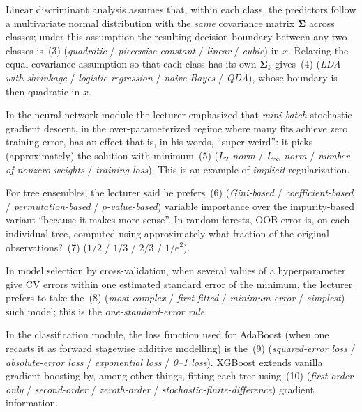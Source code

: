 \documentclass[11pt,a4paper]{article}
\begin{document}
Linear discriminant analysis assumes that, within each class, the predictors follow a multivariate normal distribution with the \emph{same} covariance matrix $\bm\Sigma$ across classes; under this assumption the resulting decision boundary between any two classes is \underline{\hspace{2.5cm}}\,(3) (\emph{quadratic} / \emph{piecewise constant} / \emph{linear} / \emph{cubic}) in $x$. Relaxing the equal-covariance assumption so that each class has its own $\bm\Sigma_k$ gives \underline{\hspace{2.5cm}}\,(4) (\emph{LDA with shrinkage} / \emph{logistic regression} / \emph{naive Bayes} / \emph{QDA}), whose boundary is then quadratic in $x$.

In the neural-network module the lecturer emphasized that \emph{mini-batch} stochastic gradient descent, in the over-parameterized regime where many fits achieve zero training error, has an effect that is, in his words, ``super weird'': it picks (approximately) the solution with minimum \underline{\hspace{2.5cm}}\,(5) (\emph{$L_2$ norm} / \emph{$L_\infty$ norm} / \emph{number of nonzero weights} / \emph{training loss}). This is an example of \emph{implicit} regularization.

For tree ensembles, the lecturer said he prefers \underline{\hspace{2.5cm}}\,(6) (\emph{Gini-based} / \emph{coefficient-based} / \emph{permutation-based} / \emph{$p$-value-based}) variable importance over the impurity-based variant ``because it makes more sense''. In random forests, OOB error is, on each individual tree, computed using approximately what fraction of the original observations? \underline{\hspace{2.5cm}}\,(7) (\emph{$1/2$} / \emph{$1/3$} / \emph{$2/3$} / \emph{$1/e^2$}).

In model selection by cross-validation, when several values of a hyperparameter give CV errors within one estimated standard error of the minimum, the lecturer prefers to take the \underline{\hspace{2.5cm}}\,(8) (\emph{most complex} / \emph{first-fitted} / \emph{minimum-error} / \emph{simplest}) such model; this is the \emph{one-standard-error rule}.

In the classification module, the loss function used for AdaBoost (when one recasts it as forward stagewise additive modelling) is the \underline{\hspace{2.5cm}}\,(9) (\emph{squared-error loss} / \emph{absolute-error loss} / \emph{exponential loss} / \emph{0--1 loss}). XGBoost extends vanilla gradient boosting by, among other things, fitting each tree using \underline{\hspace{2.5cm}}\,(10) (\emph{first-order only} / \emph{second-order} / \emph{zeroth-order} / \emph{stochastic-finite-difference}) gradient information.
\end{document}
